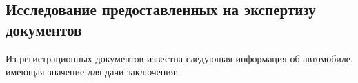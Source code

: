 %

\subsection{Исследование предоставленных на экспертизу документов}


Из регистрационных документов известна следующая информация об автомобиле, имеющая значение для дачи заключения:


